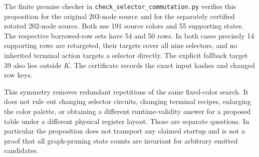 The finite premise checker in \texttt{check\_selector\_commutation.py}
verifies this proposition for the original 203-node source and for the
separately certified rotated 202-node source. Both use 191 source colors
and 55 supporting states. The respective borrowed-row sets have 54 and
50 rows. In both cases precisely 14 supporting rows are retargeted, their
targets cover all nine selectors, and no inherited terminal action targets
a selector directly. The explicit fallback target 39 also lies outside
$K$. The certificate records the exact input hashes and changed row keys.

This symmetry removes redundant repetitions of the same fixed-color search.
It does not rule out changing selector circuits, changing terminal recipes,
enlarging the color palette, or obtaining a different runtime-validity
answer for a proposed table under a different physical register layout.
Those are separate questions. In particular the proposition does not
transport any claimed startup and is not a proof that all graph-pruning
state counts are invariant for arbitrary emitted candidates.
